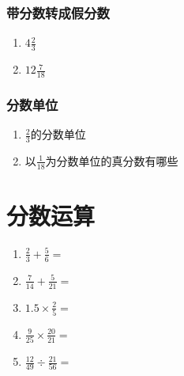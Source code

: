 \documentclass[DIN, pagenumber=false, fontsize=11pt, parskip=half]{scrartcl}
\begin{document}
\subsubsection{带分数转成假分数}
\begin{enumerate}
    \item $4\frac{2}{3}$
    \item $12\frac{7}{18}$
\end{enumerate}
\subsubsection{分数单位}
\begin{enumerate}
    \item $\frac{2}{3}$的分数单位
    \item 以$\frac{1}{18}$为分数单位的真分数有哪些
\end{enumerate}
\section{分数运算}
\begin{enumerate}
    \item $\frac{2}{3} + \frac{5}{6} = $
    \item $\frac{7}{14} + \frac{5}{21} = $
    \item $1.5 \times \frac{2}{5}  = $
    \item $\frac{9}{25} \times \frac{20}{21}  = $
    \item $\frac{12}{49} \div \frac{21}{56}  = $
\end{enumerate}
\end{document}
